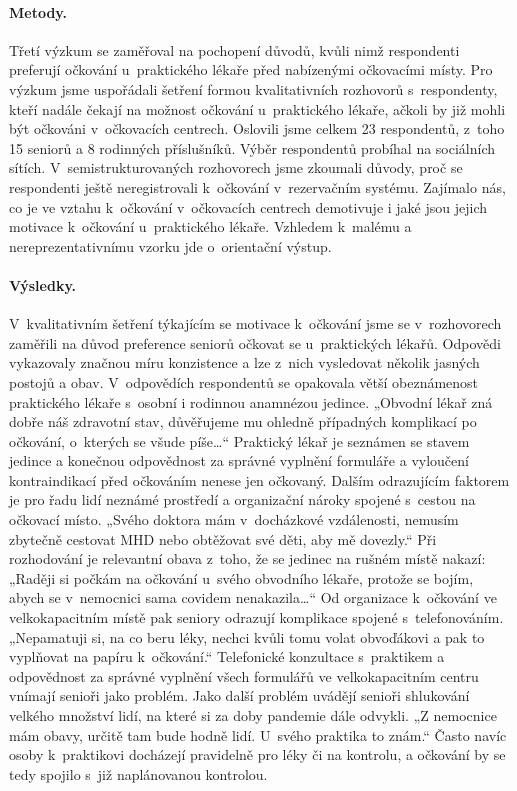 \paragraph*{Metody.}
Třetí výzkum se zaměřoval na pochopení důvodů, kvůli nimž respondenti preferují očkování u~praktického lékaře před nabízenými očkovacími místy. Pro výzkum jsme uspořádali šetření formou kvalitativních rozhovorů s~respondenty, kteří nadále čekají na možnost očkování u~praktického lékaře, ačkoli by již mohli být očkováni v~očkovacích centrech. Oslovili jsme celkem 23 respondentů, z~toho 15 seniorů a 8 rodinných příslušníků. Výběr respondentů probíhal na sociálních sítích. V~semistrukturovaných rozhovorech jsme zkoumali důvody, proč se respondenti ještě neregistrovali k~očkování v~rezervačním systému. Zajímalo nás, co je ve vztahu k~očkování v~očkovacích centrech demotivuje i jaké jsou jejich motivace k~očkování u~praktického lékaře. Vzhledem k~malému a nereprezentativnímu vzorku jde o~orientační výstup. 
 
\paragraph*{Výsledky.}
V~kvalitativním šetření týkajícím se motivace k~očkování jsme se v~rozhovorech zaměřili na důvod preference seniorů očkovat se u~praktických lékařů. Odpovědi vykazovaly značnou míru konzistence a lze z~nich vysledovat několik jasných postojů a obav.
V~odpovědích respondentů se opakovala větší obeznámenost praktického lékaře s~osobní i rodinnou anamnézou jedince. „Obvodní lékař zná dobře náš zdravotní stav, důvěřujeme mu ohledně případných komplikací po očkování, o~kterých se všude píše…“ Praktický lékař je seznámen se stavem jedince a konečnou odpovědnost za správné vyplnění formuláře a vyloučení kontraindikací před očkováním nenese jen očkovaný. 
Dalším odrazujícím faktorem je pro řadu lidí neznámé prostředí a organizační nároky spojené s~cestou na očkovací místo. „Svého doktora mám v~docházkové vzdálenosti, nemusím zbytečně cestovat MHD nebo obtěžovat své děti, aby mě dovezly.“ Při rozhodování je relevantní obava z~toho, že se jedinec na rušném místě nakazí: „Raději si počkám na očkování u~svého obvodního lékaře, protože se bojím, abych se v~nemocnici sama covidem nenakazila…“
Od organizace k~očkování ve velkokapacitním místě pak seniory odrazují komplikace spojené s~telefonováním. „Nepamatuji si, na co beru léky, nechci kvůli tomu volat obvoďákovi a pak to vyplňovat na papíru k~očkování.“ Telefonické konzultace s~praktikem a odpovědnost za správné vyplnění všech formulářů ve velkokapacitním centru vnímají senioři jako problém. Jako další problém uvádějí senioři shlukování velkého množství lidí, na které si za doby pandemie dále odvykli. „Z nemocnice mám obavy, určitě tam bude hodně lidí. U~svého praktika to znám.“ Často navíc osoby k~praktikovi docházejí pravidelně pro léky či na kontrolu, a očkování by se tedy spojilo s~již naplánovanou kontrolou.

